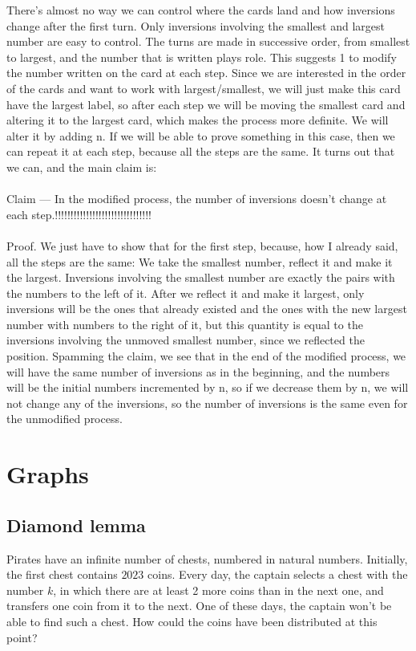  There’s almost no way we can control where the cards land and how inversions change after the first turn. Only inversions involving the smallest and largest number are easy to control. The turns are made
 in successive order, from smallest to largest, and the number that is written plays role. This suggests 1 to modify the number written on the card at each step. Since we are interested in the order of the cards and want to work with largest/smallest, we will just make this card
 have the largest label, so after each step we will be moving the smallest card and altering it to the largest card, which makes the process more definite. We will alter it by adding n. If we will be able to prove something in this case, then we can repeat it at each step, because all the steps are the same. It turns out that we can, and the main claim is:
 \\\\
 Claim — In the modified process, the number of inversions doesn’t change at each step.!!!!!!!!!!!!!!!!!!!!!!!!!!!!!!!
 \\\\
 Proof. We just have to show that for the first step, because, how I already said, all the steps are the same: We take the smallest number, reflect it and make it the largest. Inversions involving the smallest number are exactly the pairs with the numbers to the left of it. After we reflect it and make it largest, only inversions will be the ones that already existed and the ones with the new largest number with numbers to the right of it, but this quantity is equal to the inversions involving the unmoved smallest number, since we reflected the position. Spamming the claim, we see that in the end of the modified process, we will have the same number of inversions as in the beginning, and the numbers will be the initial numbers incremented by n, so if we decrease them by n, we will not change any of the inversions, so the number of inversions is the same even for the unmodified process.

\section{Graphs}

\subsection{Diamond lemma}

\begin{example}
    Pirates have an infinite number of chests, numbered in natural numbers. Initially, the first chest contains $2023$ coins. Every day, the captain selects a chest with the number $k$, in which there are at least 2 more coins than in the next one, and transfers one coin from it to the next. One of these days, the captain won't be able to find such a chest. How could the coins have been distributed at this point?
\end{example}

